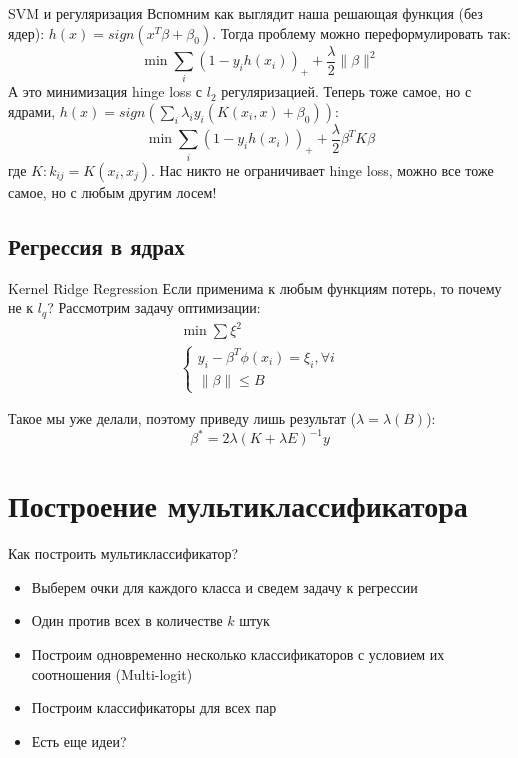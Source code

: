 \documentclass[14pt, fleqn, xcolor={dvipsnames, table}]{beamer}
\begin{document}
\begin{frame}{SVM и регуляризация}
\small
Вспомним как выглядит наша решающая функция (без ядер): $h(x) = sign(x^T \beta + \beta_0)$. Тогда проблему можно переформулировать так:
$$
\min \sum_i (1 - y_i h(x_i))_+ + \frac{\lambda}{2} \|\beta\|^2
$$
А это минимизация hinge loss с $l_2$ регуляризацией. Теперь тоже самое, но с ядрами, $h(x) = sign \left(\sum_i \lambda_i y_i (K(x_i, x) + \beta_0)\right)$:
$$
\min \sum_i (1 - y_i h(x_i))_+ + \frac{\lambda}{2} \beta^T K \beta
$$
где $K : k_{ij} = K(x_i, x_j)$. Нас никто не ограничивает hinge loss, можно все тоже самое, но с любым другим лосем!
\end{frame}

\subsection{Регрессия в ядрах}
\begin{frame}{Kernel Ridge Regression}
\small
Если применима к любым функциям потерь, то почему не к $l_q$? Рассмотрим задачу оптимизации:
$$\begin{array}{l}
\min \sum \xi^2 \\
\left\{\begin{array}{l}
  y_i - \beta^T \phi(x_i) = \xi_i, \forall i \\
  \|\beta\| \le B
\end{array}\right.
\end{array}$$

Такое мы уже делали, поэтому приведу лишь результат ($\lambda = \lambda(B)$):
$$
\beta^* = 2 \lambda \left(K + \lambda E\right)^{-1}y
$$
\end{frame}

\section{Построение мультиклассификатора} %
\begin{frame}{Как построить мультиклассификатор?}
\begin{itemize}
  \item Выберем очки для каждого класса и сведем задачу к регрессии
  \item Один против всех в количестве $k$ штук
  \item Построим одновременно несколько классификаторов с условием их соотношения (Multi-logit)
  \item Построим классификаторы для всех пар
  \item Есть еще идеи?
\end{itemize}
\end{frame}
\end{document}
